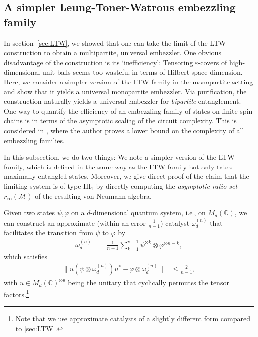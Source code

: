 \documentclass[a4paper, 10pt, onecolumn, accepted=2025-07-22]{quantumarticle}
\theoremstyle{definition}
\newcommand{\norm}[1]{\lVert #1\rVert}
\newcommand{\ox}{\otimes}
\newcommand{\mc}{\mathcal}
\newcommand{\eps}{\varepsilon}
\newcommand{\III}{{\mathrm{III}}}
\def\CC{{\mathbb C}}
\def\M{{\mc M}}
\newcommand*{\1}{\text{\usefont{U}{bbold}{m}{n}1}}
\begin{document}
\subsection{A simpler Leung-Toner-Watrous embezzling family}
\label{sec:simpler-ltw}
In section~\ref{sec:LTW}, we showed that one can take the limit of the LTW construction to obtain a multipartite, universal embezzler. 
One obvious disadvantage of the construction is its `inefficiency': 
Tensoring $\eps$-covers of high-dimensional unit balls seems too wasteful in terms of Hilbert space dimension. Here, we consider a simpler version of the LTW family in the monopartite setting and show that it yields a universal monopartite embezzler. Via purification, the construction naturally yields a universal embezzler for \emph{bipartite} entanglement.
One way to quantify the efficiency of an embezzling family of states on finite spin chains is in terms of the asymptotic scaling of the circuit complexity. 
This is considered in \cite{schwartzman_complexity_2024}, where the author proves a lower bound on the complexity of all embezzling families.

In this subsection, we do two things: 
We note a simpler version of the LTW family, which is defined in the same way as the LTW family but only takes maximally entangled states. 
Moreover, we give direct proof of the claim that the limiting system is of type $\III_1$ by directly computing the \emph{asymptotic ratio set} $r_\infty(\M)$ of the resulting von Neumann algebra.

Given two states $\psi,\varphi$ on a $d$-dimensional quantum system, i.e., on $M_{d}(\CC)$, we can construct an approximate (within an error $\tfrac{1}{n-1}$) catalyst $\omega^{(n)}_{d}$ that facilitates the transition from $\psi$ to $\varphi$ by
\begin{align}
\label{eq:approx_cat}
\omega^{(n)}_{d} & = \tfrac{1}{n-1}\sum_{k=1}^{n-1}\psi^{\ox k}\ox\varphi^{\ox n-k},    
\end{align}
which satisfies
\begin{align}
\label{eq:approx_cat_err}
\norm{u(\psi\ox\omega^{(n)}_{d})u^{*}-\varphi\ox\omega^{(n)}_{d}} & \leq \tfrac{2}{n-1},
\end{align}
with $u\in M_{d}(\CC)^{\ox n}$ being the unitary that cyclically permutes the tensor factors.\footnote{Note that we use approximate catalysts of a slightly different form compared to \cref{sec:LTW}.}
\end{document}
